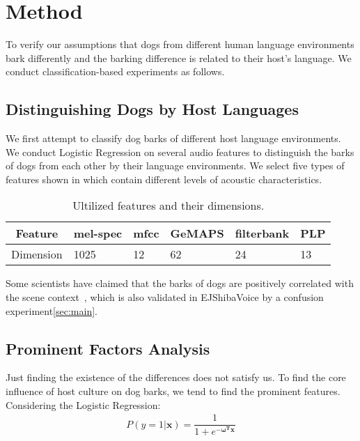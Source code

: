 \section{Method}
To verify our assumptions that dogs from different human language environments bark differently and the barking difference is related to their host's language. We conduct classification-based experiments as follows.
\subsection{Distinguishing Dogs by Host Languages}
We first attempt to classify dog barks of different host language environments. We conduct Logistic Regression on several audio features to distinguish the barks of dogs from each other by their language environments. We select five types of features shown in  which contain different levels of acoustic characteristics. 


\begin{table}[H]
	\scriptsize
	\centering
	\begin{tabular}{l|l|lllll}
		\toprule
		\multicolumn{2}{c|}{Feature}            & mel-spec & mfcc    & GeMAPS   &filterbank &PLP  \\
		\midrule
		\multicolumn{2}{c|}{Dimension}          & 1025        & 12         & 62    & 24 &  13    \\
		\bottomrule
	\end{tabular}
	\caption{Ultilized features and their dimensions.}
	\label{table:feature}
\end{table}

Some scientists have claimed that the barks of dogs are positively correlated with the scene context~\cite{larranaga2015comparing, molnar2008classification}, which is also validated in EJShibaVoice by  a confusion experiment\ref{sec:main}.


\subsection{Prominent Factors Analysis}
Just finding the existence of the differences does not satisfy us. To find the core influence of host culture on dog barks, we tend to find the prominent features. Considering the Logistic Regression:
\begin{align}
    P(y=1|\bm{x}) = \dfrac{1}{1 + e^{\bm{-\omega^Tx}}}
    \label{eq:lr}
\end{align}

